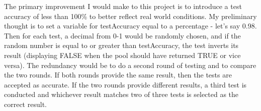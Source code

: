 \documentclass[letterpaper, 10pt]{article}
\begin{document}
\hspace{1.0em}The primary improvement I would make to this project is to introduce a test accuracy of less than 100\% to better reflect real world conditions. My preliminary thought is to set a variable for testAccuracy equal to a percentage - let's say 0.98. Then for each test, a decimal from 0-1 would be randomly chosen, and if the random number is equal to or greater than testAccuracy, the test inverts its result (displaying FALSE when the pool should have returned TRUE or vice versa). The redundancy would be to do a second round of testing and to compare the two rounds. If both rounds provide the same result, then the tests are accepted as accurate. If the two rounds provide different results, a third test is conducted and whichever result matches two of three tests is selected as the correct result.
\end{document}
